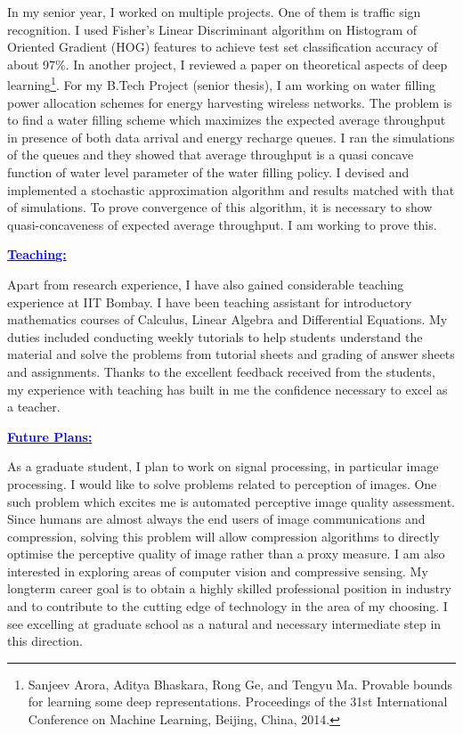 \documentclass[11pt]{article}
\newcommand{\statement}[1]{\par\medskip
  \underline{\textcolor{blue}{\textbf{#1:}}}\space
}
\begin{document}
In my senior year, I worked on multiple projects.
One of them is traffic sign recognition.
I used Fisher's Linear Discriminant algorithm on Histogram of Oriented Gradient (HOG) features to achieve test set classification accuracy of about 97\%. 
In another project, I reviewed a paper on theoretical aspects of deep learning\footnote{ Sanjeev Arora, Aditya Bhaskara, Rong Ge, and Tengyu Ma. Provable bounds for learning some deep representations. Proceedings of the 31st International Conference on Machine Learning, Beijing, China, 2014.}.
For my B.Tech Project (senior thesis), I am working on water filling power allocation schemes for energy harvesting wireless networks. 
The problem is to find a water filling scheme which maximizes the expected average throughput in presence of both data arrival and energy recharge queues. 
I ran the simulations of the queues and they showed that average throughput is a quasi concave function of water level parameter of the water filling policy. 
I devised and implemented a stochastic approximation algorithm and results matched with that of simulations. 
To prove convergence of this algorithm, it is necessary to show quasi-concaveness of expected average throughput. I am working to prove this.

\statement{Teaching}
Apart from research experience, I have also gained considerable teaching experience at IIT Bombay. 
I have been teaching assistant for introductory mathematics courses of Calculus, Linear Algebra and Differential Equations. 
My duties included conducting weekly tutorials to help students understand the material and solve the problems from tutorial sheets and grading of answer sheets and assignments. Thanks to the excellent feedback received from the students, my experience with teaching has built in me the confidence necessary to excel as a teacher.

\statement{Future Plans}
As a graduate student, I plan to work on signal processing, in particular image processing. 
I would like to solve problems related to perception of images. One such problem which excites me is automated perceptive image quality assessment.
Since humans are almost always the end users of image communications and compression, solving this problem will allow compression algorithms to directly optimise the perceptive quality of image rather than a proxy measure. 
I am also interested in exploring areas of computer vision and compressive sensing. 
My longterm career goal is to obtain a highly skilled professional position in industry and to contribute to the cutting edge of technology in the area of my choosing. 
I see excelling at graduate school as a natural and necessary intermediate step in this direction.
\end{document}
